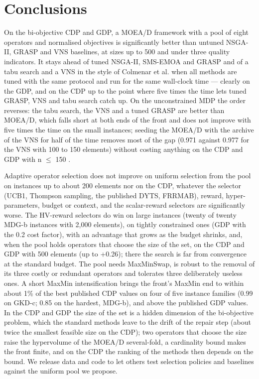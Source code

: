 \section{Conclusions}\label{sec:conclusions}

On the bi-objective CDP and GDP, a MOEA/D framework with a pool of eight operators and normalised objectives is significantly better than untuned NSGA-II, GRASP and VNS baselines, at sizes up to 500 and under three quality indicators. It stays ahead of tuned NSGA-II, SMS-EMOA and GRASP and of a tabu search and a VNS in the style of Colmenar et al. when all methods are tuned with the same protocol and run for the same wall-clock time --- clearly on the GDP, and on the CDP up to the point where five times the time lets tuned GRASP, VNS and tabu search catch up. On the unconstrained MDP the order reverses: the tabu search, the VNS and a tuned GRASP are better than MOEA/D, which falls short at both ends of the front and does not improve with five times the time on the small instances; seeding the MOEA/D with the archive of the VNS for half of the time removes most of the gap (0.971 against 0.977 for the VNS with 100 to 150 elements) without costing anything on the CDP and GDP with n $\leq$ 150 .

Adaptive operator selection does not improve on uniform selection from the pool on instances up to about 200 elements nor on the CDP, whatever the selector (UCB1, Thompson sampling, the published DYTS, FRRMAB), reward, hyper-parameters, budget or context, and the scalar-reward selectors are significantly worse. The HV-reward selectors do win on large instances (twenty of twenty MDG-b instances with 2,000 elements), on tightly constrained ones (GDP with the 0.2 cost factor), with an advantage that grows as the budget shrinks, and, when the pool holds operators that choose the size of the set, on the CDP and GDP with 500 elements (up to +0.26); there the search is far from convergence at the standard budget. The pool needs MaxMinSwap, is robust to the removal of its three costly or redundant operators and tolerates three deliberately useless ones. A short MaxMin intensification brings the front's MaxMin end to within about 1\% of the best published CDP values on four of five instance families (0.99 on GKD-c; 0.85 on the hardest, MDG-b), and above the published GDP values. In the CDP and GDP the size of the set is a hidden dimension of the bi-objective problem, which the standard methods leave to the drift of the repair step (about twice the smallest feasible size on the CDP); two operators that choose the size raise the hypervolume of the MOEA/D several-fold, a cardinality bound makes the front finite, and on the CDP the ranking of the methods then depends on the bound. We release data and code to let others test selection policies and baselines against the uniform pool we propose.

